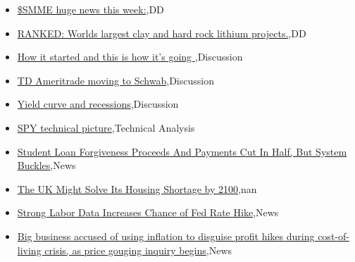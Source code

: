 \documentclass{article}%
\begin{document}
%
\begin{itemize}%
\item%
\href{https://reddit.com/r/Baystreetbets/comments/16p8u1k/smme\_huge\_news\_this\_week/}{\$SMME huge news this week:},DD%
\item%
\href{https://reddit.com/r/Baystreetbets/comments/16on2di/ranked\_worlds\_largest\_clay\_and\_hard\_rock\_lithium/}{RANKED: Worlds largest clay and hard rock lithium projects.},DD%
\item%
\href{https://reddit.com/r/StockMarket/comments/16p3hke/how\_it\_started\_and\_this\_is\_how\_its\_going/}{How it started and this is how it's going },Discussion%
\item%
\href{https://reddit.com/r/StockMarket/comments/16okep7/td\_ameritrade\_moving\_to\_schwab/}{TD Ameritrade moving to Schwab},Discussion%
\item%
\href{https://reddit.com/r/StockMarket/comments/16oi3nh/yield\_curve\_and\_recessions/}{Yield curve and recessions},Discussion%
\item%
\href{https://reddit.com/r/StockMarket/comments/16oh2ps/spy\_technical\_picture/}{SPY technical picture},Technical Analysis%
\item%
\href{https://reddit.com/r/Economics/comments/16p7jsd/student\_loan\_forgiveness\_proceeds\_and\_payments/}{Student Loan Forgiveness Proceeds And Payments Cut In Half, But System Buckles},News%
\item%
\href{https://reddit.com/r/Economics/comments/16os9ly/the\_uk\_might\_solve\_its\_housing\_shortage\_by\_2100/}{The UK Might Solve Its Housing Shortage by 2100},nan%
\item%
\href{https://reddit.com/r/Economics/comments/16oojg3/strong\_labor\_data\_increases\_chance\_of\_fed\_rate/}{Strong Labor Data Increases Chance of Fed Rate Hike},News%
\item%
\href{https://reddit.com/r/Economics/comments/16onbcv/big\_business\_accused\_of\_using\_inflation\_to/}{Big business accused of using inflation to disguise profit hikes during cost-of-living crisis, as price gouging inquiry begins},News%
\end{itemize}%
\end{document}
